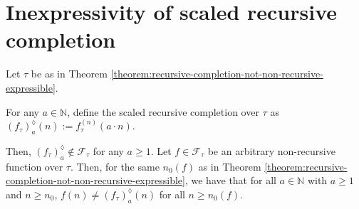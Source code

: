 \section{Inexpressivity of scaled recursive completion}
\label{app:scaled-recursive-completion-inexpressible}
\begin{corollary}
	\label{cor:scaled-recursive-completion-not-non-recursive-expressible}
	Let $\tau$ be as in Theorem \ref{theorem:recursive-completion-not-non-recursive-expressible}.
	
	For any $a\in\mathbb{N}$, define the scaled recursive completion over $\tau$ as
	$\left(f_{\tau}\right)_{a}^{\lozenge}(n):=f_{\tau}^{(n)}(a\cdot n)$.
	
	Then, $\left(f_{\tau}\right)_{a}^{\lozenge}\notin \mathcal{F}_{\tau}$ for any $a \geq 1$.
	Let $f\in\mathcal{F}_{\tau}$ be an arbitrary non-recursive function over $\tau$.
	Then, for the same $n_0(f)$ as in Theorem \ref{theorem:recursive-completion-not-non-recursive-expressible}, we have that for all $a\in\mathbb{N}$ with $a\geq 1$ and $n\geq n_0$, $f(n)\neq \left(f_{\tau}\right)_{a}^{\lozenge}(n)$ for all $n\geq n_0(f)$.
\end{corollary}
